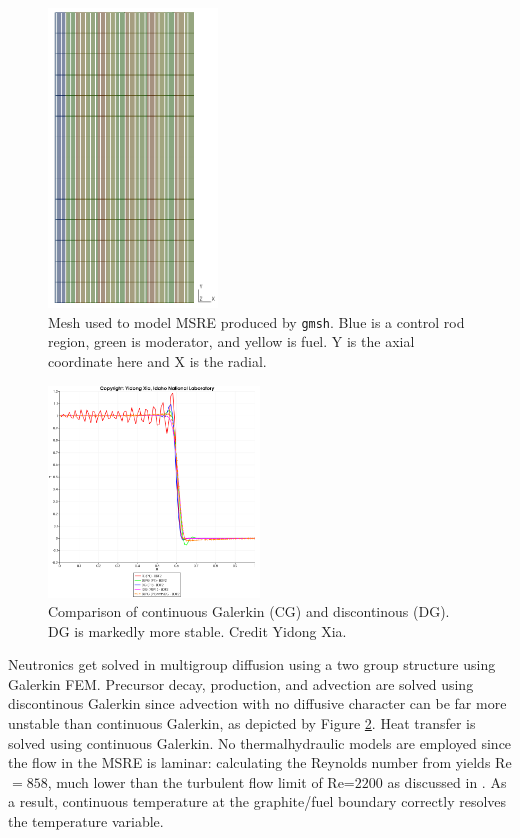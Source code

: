 \documentclass[12pt]{article}
\begin{document}
\begin{figure}[ht]
\centering
\includegraphics[width=0.4\textwidth]{msre2DMesh}
\caption{Mesh used to model MSRE produced by \texttt{gmsh}. Blue is a control rod region, green is moderator, and yellow is fuel. Y is the axial coordinate here and X is the radial.}
\label{fig:msremesh}
\end{figure}

\begin{figure}
\centering
\includegraphics[width=0.5\textwidth]{xiaDG}
\caption{Comparison of continuous Galerkin (CG) and discontinous (DG). DG is markedly more stable. Credit Yidong Xia.}
\label{fig:DGISKEWL}
\end{figure}

Neutronics get solved in multigroup diffusion using a two group structure using Galerkin FEM. Precursor decay, production, and advection are solved using discontinous Galerkin since advection with no diffusive character can be far more unstable than continuous Galerkin, as depicted by Figure \ref{fig:DGISKEWL}. Heat transfer is solved using continuous Galerkin. No thermalhydraulic models are employed since the flow in the MSRE is laminar: calculating the Reynolds number from \cite{robertson_msre} yields Re$=858$, much lower than the turbulent flow limit of Re=$2200$ as discussed in \cite{schmidt_introduction_1993}. As a result, continuous temperature at the graphite/fuel boundary correctly resolves the temperature variable.
\end{document}
